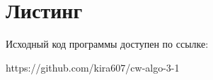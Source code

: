 \section*{Листинг}

Исходный код программы доступен по ссылке: 

https://github.com/kira607/cw-algo-3-1